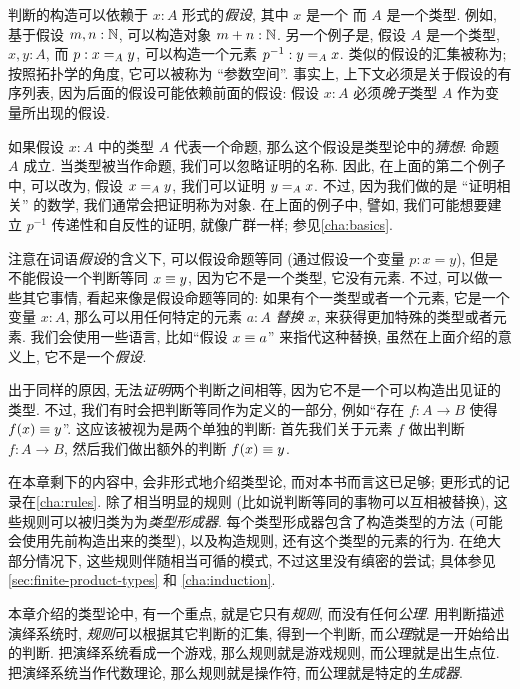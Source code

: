 %
判断的构造可以依赖于 $x:A$ 形式的\emph{假设}, 其中 $x$ 是一个 %
而 $A$ 是一个类型. 例如, 基于假设 $m,n : \nat$, 可以构造对象 $m + n : \nat$. 另一个例子是, 假设 $A$ 是一个类型, $x,y : A$, 而  $p : \id[A]{x}{y}$, 可以构造一个元素 $p^{-1} : \id[A]{y}{x}$. 类似的假设的汇集被称为;%
按照拓扑学的角度, 它可以被称为 ``参数空间''. 事实上, 上下文必须是关于假设的有序列表, 因为后面的假设可能依赖前面的假设: 假设 $x:A$ 必须\emph{晚于}类型 $A$ 作为变量所出现的假设.

如果假设 $x:A$ 中的类型 $A$ 代表一个命题, 那么这个假设是类型论中的\emph{猜想}: %
命题 $A$ 成立. 当类型被当作命题, 我们可以忽略证明的名称. 因此, 在上面的第二个例子中, 可以改为, 假设 $\id[A]{x}{y}$, 我们可以证明 $\id[A]{y}{x}$. 不过, 因为我们做的是 ``证明相关'' 的数学, %
我们通常会把证明称为对象. 在上面的例子中, 譬如, 我们可能想要建立 $p^{-1}$ 传递性和自反性的证明, 就像广群一样; 参见\cref{cha:basics}.

注意在词语\emph{假设}的含义下, 可以假设命题等同 (通过假设一个变量 $p:x=y$), 但是不能假设一个判断等同 $x\jdeq y$, 因为它不是一个类型, 它没有元素. 不过, 可以做一些其它事情, 看起来像是假设命题等同的: 如果有个一类型或者一个元素, 它是一个变量 $x:A$, 那么可以用任何特定的元素 $a:A$ \emph{替换} $x$, 来获得更加特殊的类型或者元素. 我们会使用一些语言, 比如``假设 $x\jdeq a$'' 来指代这种替换, 虽然在上面介绍的意义上, 它不是一个\emph{假设}.%

出于同样的原因, 无法\emph{证明}两个判断之间相等, 因为它不是一个可以构造出见证的类型. 不过, 我们有时会把判断等同作为定义的一部分, 例如``存在 $f:A\to B$ 使得 $f(x)\jdeq y$''. 这应该被视为是两个单独的判断: 首先我们关于元素 $f$ 做出判断  $f:A\to B$, 然后我们做出额外的判断 $f(x)\jdeq y$.

在本章剩下的内容中, 会非形式地介绍类型论, 而对本书而言这已足够; 更形式的记录在\cref{cha:rules}. 除了相当明显的规则 (比如说判断等同的事物可以互相被替换), 这些规则可以被归类为为\emph{类型形成器}. 每个类型形成器包含了构造类型的方法 (可能会使用先前构造出来的类型), 以及构造规则, 还有这个类型的元素的行为. 在绝大部分情况下, 这些规则伴随相当可循的模式, 不过这里没有缜密的尝试; 具体参见 \cref{sec:finite-product-types} 和 \cref{cha:induction}.


%
%
本章介绍的类型论中, 有一个重点, 就是它只有\emph{规则}, 而没有任何\emph{公理}. 用判断描述演绎系统时, \emph{规则}可以根据其它判断的汇集, 得到一个判断, 而\emph{公理}就是一开始给出的判断. 把演绎系统看成一个游戏, 那么规则就是游戏规则, 而公理就是出生点位. 把演绎系统当作代数理论, 那么规则就是操作符, 而公理就是特定的\emph{生成器}.

